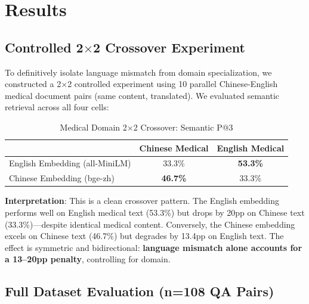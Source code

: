 ﻿\documentclass[11pt,a4paper]{article}
\begin{document}
\section{Results}

\subsection{Controlled 2$\times$2 Crossover Experiment}

To definitively isolate language mismatch from domain specialization, we constructed a 2$\times$2 controlled experiment using 10 parallel Chinese-English medical document pairs (same content, translated). We evaluated semantic retrieval across all four cells:

\begin{table}[h]
\centering
\caption{Medical Domain 2$\times$2 Crossover: Semantic P@3}
\begin{tabular}{lcc}
\toprule
& \textbf{Chinese Medical} & \textbf{English Medical} \\
\midrule
English Embedding (all-MiniLM) & 33.3\% & \textbf{53.3\%} \\
Chinese Embedding (bge-zh)    & \textbf{46.7\%} & 33.3\% \\
\bottomrule
\end{tabular}
\end{table}

\textbf{Interpretation}: This is a clean crossover pattern. The English embedding performs well on English medical text (53.3\%) but drops by 20pp on Chinese text (33.3\%)---despite identical medical content. Conversely, the Chinese embedding excels on Chinese text (46.7\%) but degrades by 13.4pp on English text. The effect is symmetric and bidirectional: \textbf{language mismatch alone accounts for a 13--20pp penalty}, controlling for domain.

\subsection{Full Dataset Evaluation (n=108 QA Pairs)}
\end{document}
